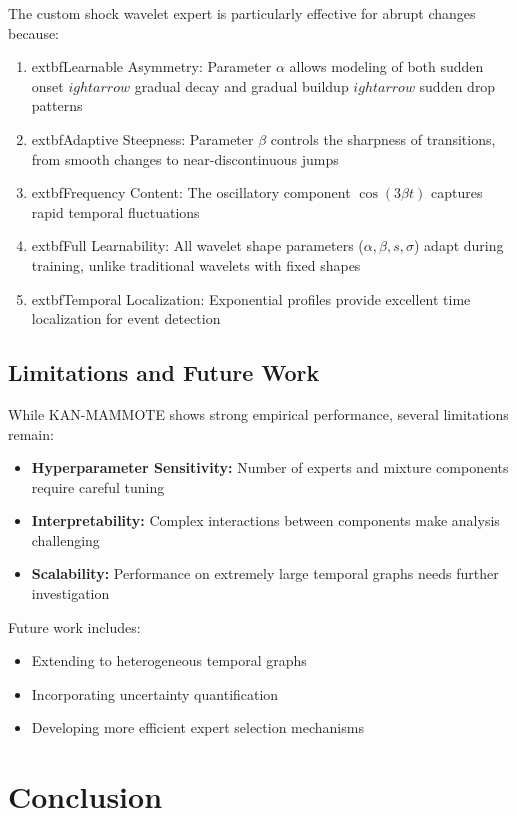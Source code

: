 \documentclass[conference]{IEEEtran}
\begin{document}
The custom shock wavelet expert is particularly effective for abrupt changes because:
\begin{enumerate}
\item 	extbf{Learnable Asymmetry:} Parameter $\alpha$ allows modeling of both sudden onset $
ightarrow$ gradual decay and gradual buildup $
ightarrow$ sudden drop patterns
\item 	extbf{Adaptive Steepness:} Parameter $\beta$ controls the sharpness of transitions, from smooth changes to near-discontinuous jumps
\item 	extbf{Frequency Content:} The oscillatory component $\cos(3\beta t)$ captures rapid temporal fluctuations
\item 	extbf{Full Learnability:} All wavelet shape parameters ($\alpha, \beta, s, \sigma$) adapt during training, unlike traditional wavelets with fixed shapes
\item 	extbf{Temporal Localization:} Exponential profiles provide excellent time localization for event detection
\end{enumerate}

\subsection{Limitations and Future Work}

While KAN-MAMMOTE shows strong empirical performance, several limitations remain:
\begin{itemize}
\item \textbf{Hyperparameter Sensitivity:} Number of experts and mixture components require careful tuning
\item \textbf{Interpretability:} Complex interactions between components make analysis challenging
\item \textbf{Scalability:} Performance on extremely large temporal graphs needs further investigation
\end{itemize}

Future work includes:
\begin{itemize}
\item Extending to heterogeneous temporal graphs
\item Incorporating uncertainty quantification
\item Developing more efficient expert selection mechanisms
\end{itemize}

\section{Conclusion}
\end{document}
